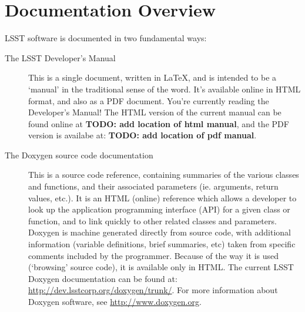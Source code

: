
\renewcommand{\LaTeX}{LaTeX\xspace}

\newcommand{\tttex}{\texttt{.tex}\xspace}
\newcommand{\ttlsstpackages}{\texttt{lsstPackages.tex}\xspace}
\newcommand{\ttinput}{\texttt{\textbackslash input}\xspace}
\newcommand{\ttlsstmanual}{\texttt{lsstManual.tex}\xspace}
\newcommand{\ttdevenvdoc}{\texttt{devenv/doc}\xspace}
\newcommand{\tteups}{\texttt{eups}\xspace}
\newcommand{\ttsetup}{\texttt{setup}\xspace}
\newcommand{\ttscons}{\texttt{scons}\xspace}
\newcommand{\ttlsstinput}{\texttt{\textbackslash lsstinput}\xspace}
\newcommand{\ttlatextohtml}{\texttt{latex2html}\xspace}

\newcommand{\ttdoxygenconf}{\texttt{doxgyen.conf}\xspace}

\newcommand{\ttpackage}{\texttt{package.tex}\xspace}

\newcommand{\todo}[1]{{\bfseries\large TODO: #1}}

\section{Documentation Overview\label{sec-doc-overview}}

LSST software is documented in two fundamental ways:

\begin{description}
  
\item[The LSST Developer's Manual] This is a single document, written
  in \LaTeX, and is intended to be a `manual' in the traditional sense
  of the word.  It's available online in HTML format, and also as a
  PDF document. You're currently reading the Developer's Manual!  The
  HTML version of the current manual can be found online at \todo{add
    location of html manual}, and the PDF version is availabe at:
  \todo{add location of pdf manual}.

\item[The Doxygen source code documentation] This is a source code
  reference, containing summaries of the various classes and
  functions, and their associated parameters (ie. arguments, return
  values, etc.).  It is an HTML (online) reference which allows a
  developer to look up the application programming interface (API) for
  a given class or function, and to link quickly to other related
  classes and parameters.  Doxygen is machine generated directly from
  source code, with additional information (variable definitions,
  brief summaries, etc) taken from specific comments included by the
  programmer. Because of the way it is used (`browsing' source code),
  it is available only in HTML.  The current LSST Doxygen
  documentation can be found at:
  \url{http://dev.lsstcorp.org/doxygen/trunk/}.  For more information
  about Doxygen software, see \url{http://www.doxygen.org}.
    
\end{description}

